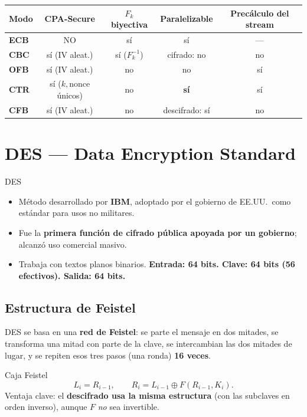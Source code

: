 \documentclass[11pt,a4paper]{article}
\newcommand{\xor}{\oplus}
\begin{document}
\begin{center}
\renewcommand{\arraystretch}{1.25}
\begin{tabular}{>{\bfseries}l c c c c}
\toprule
Modo & CPA-Secure & $F_k$ biyectiva & Paralelizable & Precálculo del stream\\
\midrule
ECB & \textcolor{attackRed}{NO} & sí & sí & ---\\
CBC & sí (IV aleat.) & sí ($F_k^{-1}$) & cifrado: no & no\\
OFB & sí (IV aleat.) & no & no & sí\\
CTR & sí ($k,$nonce únicos) & no & \textbf{sí} & sí\\
CFB & sí (IV aleat.) & no & descifrado: sí & no\\
\bottomrule
\end{tabular}
\end{center}

\section{DES — Data Encryption Standard}

\begin{defbox}{DES}
\begin{itemize}[leftmargin=1.4em,itemsep=1pt]
  \item Método desarrollado por \textbf{IBM}, adoptado por el gobierno de EE.UU.\ como
        estándar para usos no militares.
  \item Fue la \textbf{primera función de cifrado pública apoyada por un gobierno};
        alcanzó uso comercial masivo.
  \item Trabaja con textos planos binarios. \textbf{Entrada: 64 bits. Clave: 64 bits
        (56 efectivos). Salida: 64 bits.}
\end{itemize}
\end{defbox}

\subsection{Estructura de Feistel}

DES se basa en una \textbf{red de Feistel}: se parte el mensaje en dos mitades, se
transforma una mitad con parte de la clave, se intercambian las dos mitades de lugar, y se
repiten esos tres pasos (una ronda) \textbf{16 veces}.

\begin{defbox}{Caja Feistel}
\[
  L_i = R_{i-1},\qquad R_i = L_{i-1}\xor F(R_{i-1}, K_{i}).
\]
Ventaja clave: el \textbf{descifrado usa la misma estructura} (con las subclaves en orden
inverso), aunque $F$ \emph{no} sea invertible.
\end{defbox}
\end{document}
